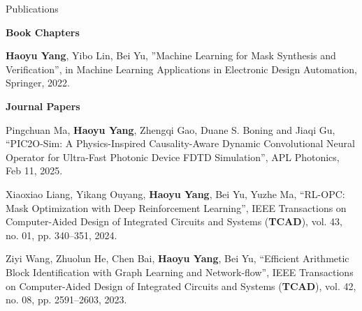 
\begin{rSection}{Publications}
	
\iftrue



\textbf{Book Chapters}
\begin{description}[font=\normalfont]
	
	\item[{[B1]}]{
		\textbf{Haoyu Yang}, Yibo Lin, Bei Yu,
		''Machine Learning for Mask Synthesis and Verification'', 
		in Machine Learning Applications in Electronic Design Automation,
		Springer, 2022.
	}
	
\end{description}


\textbf{Journal Papers}
\begin{description}[font=\normalfont]

\item[{[J18]}]{
	Pingchuan Ma, \textbf{Haoyu Yang}, Zhengqi Gao, Duane S. Boning and Jiaqi Gu,
	``PIC2O-Sim: A Physics-Inspired Causality-Aware Dynamic Convolutional Neural Operator for Ultra-Fast Photonic Device FDTD Simulation'', 
	APL Photonics, Feb 11, 2025.
}
	
\item[{[J17]}]{
	Xiaoxiao Liang, Yikang Ouyang, \textbf{Haoyu Yang}, Bei Yu, Yuzhe Ma,
	``RL-OPC: Mask Optimization with Deep Reinforcement Learning'', 
	 IEEE Transactions on Computer-Aided Design of Integrated Circuits and Systems (\textbf{TCAD}), vol. 43, no. 01, pp. 340–351, 2024.
}
	
\item[{[J16]}]{
	Ziyi Wang, Zhuolun He, Chen Bai, \textbf{Haoyu Yang}, Bei Yu,
	``Efficient Arithmetic Block Identification with Graph Learning and Network-flow'', 
	IEEE Transactions on Computer-Aided Design of Integrated Circuits and Systems (\textbf{TCAD}), vol. 42, no. 08, pp. 2591–2603, 2023.
}	



\end{description}
\end{rSection}
